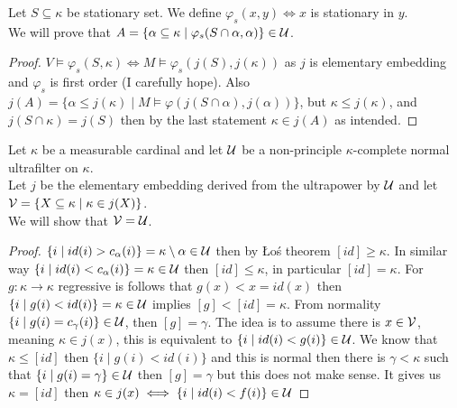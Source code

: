 \subquestion{}
Let $S \subseteq \kappa$ be stationary set.
We define $\varphi_s(x, y) \iff x$ is stationary in $y$. \\
We will prove that $A = \{\alpha \subseteq \kappa \mid \varphi_s(S \cap \alpha, \alpha) \} \in \mathcal{U}$.
\begin{proof}
	$V \models \varphi_s(S, \kappa) \iff M \models \varphi_s(j(S), j(\kappa))$ as $j$ is elementary embedding and $\varphi_s$ is first order (I carefully hope).
	Also $j(A) = \{ \alpha \le j(\kappa) \mid M \models \varphi(j(S \cap \alpha), j(\alpha)) \}$, but $\kappa \le j(\kappa)$, and $j(S \cap \kappa) = j(S)$ then by the last statement $\kappa \in j(A)$ as intended.
\end{proof}

\question{}
Let $\kappa$ be a measurable cardinal and let $\mathcal{U}$ be a non-principle $\kappa$-complete normal ultrafilter on $\kappa$. \\
Let $j$ be the elementary embedding derived from the ultrapower by $\mathcal{U}$ and let $\mathcal{V} = \{ X \subseteq \kappa \mid \kappa \in j(X) \}$. \\
We will show that $\mathcal{V} = \mathcal{U}$.
\begin{proof}
	$\{ i \mid id(i) > c_\alpha(i) \} = \kappa \setminus \alpha \in \mathcal{U}$ then by Łoś theorem $[id] \ge \kappa$.
	In similar way $\{ i \mid id(i) < c_\alpha(i) \} = \kappa \in \mathcal{U}$ then $[id] \le \kappa$, in particular $[id] = \kappa$.
	For $g : \kappa \to \kappa$ regressive is follows that $g(x) < x = id(x)$ then $\{ i \mid g(i) < id(i) \} = \kappa \in \mathcal{U}$ implies $[g] < [id] = \kappa$.
	From normality $\{ i \mid g(i) = c_\gamma(i) \} \in \mathcal{U}$, then $[g] = \gamma$.
	The idea is to assume there is $x \in \mathcal{V}$, meaning $\kappa \in j(x)$, this is equivalent to $\{ i \mid id(i) < g(i) \} \in \mathcal{U}$.
	We know that $\kappa \le [id]$ then $\{ i \mid g(i) < id(i) \}$ and this is normal then there is $\gamma < \kappa$ such that $\{ i \mid g(i) = \gamma \} \in \mathcal{U}$ then $[g] = \gamma$ but this does not make sense.
	It gives us $\kappa = [id]$ then $\kappa \in j(x) \iff \{ i \mid id(i) < f(i) \} \in \mathcal{U}$
\end{proof}


